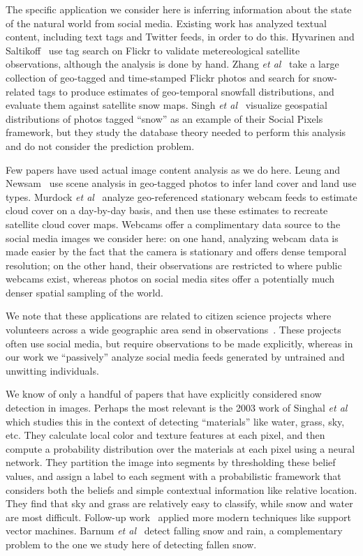 The specific application we consider here is inferring
information about the state of the natural world from social media.
Existing work has analyzed textual content, including text tags and
Twitter feeds, in order to do this. Hyvarinen and
Saltikoff~\cite{meteo} use tag search on Flickr to validate
metereological satellite observations, although the analysis is done
by hand. Zhang \textit{et al}~\cite{ecology2012www} take a large
collection of geo-tagged and time-stamped Flickr photos and search for
snow-related tags to produce estimates of geo-temporal snowfall
distributions, and evaluate them against satellite snow maps.
Singh \textit{et al}~\cite{singh10socialpixels} visualize geospatial
distributions of photos tagged ``snow'' as an example of
their Social Pixels framework, but they study the
database theory needed to perform this analysis
and do not consider the prediction problem.  

Few papers have used actual image content
analysis as we do here. Leung and Newsam~\cite{Leung:2010wa} use scene
analysis in geo-tagged photos to infer land cover and land use types.
Murdock \textit{et al}~\cite{murdock} analyze  geo-referenced
stationary webcam feeds to estimate cloud cover on a day-by-day
basis, and then use these estimates to recreate satellite cloud cover
maps.  Webcams offer a complimentary data source to the social media
images we consider here: on one hand, analyzing webcam data is made
easier by the fact that the camera is stationary and offers dense
temporal resolution; on the other hand, their observations are restricted to 
where public webcams exist, whereas photos on social media sites 
offer a potentially much denser spatial sampling of the world.

We note that these applications are related to citizen science
projects where volunteers across a wide geographic area send 
in observations~\cite{greatsunflower,ebirds,king09snowtweets}. These projects
often use social media, but require observations to be made
explicitly, whereas in our work we ``passively'' analyze social
media feeds generated by untrained and unwitting individuals.

 We know of only a handful of
papers that have explicitly considered snow detection in
images. Perhaps the most relevant is the 2003 work of Singhal
\textit{et al}~\cite{singhal2003spatialcontext,luo2003spatialcontext}
which studies this in the context of detecting ``materials'' like
water, grass, sky, etc. They calculate local color and texture
features at each pixel, and then compute a probability
distribution over the materials at each pixel using a neural
network. They partition the image into segments by thresholding these
belief values, and assign a label to each segment with a probabilistic
framework that considers both the beliefs and simple
contextual information like relative location.
 They find that sky and grass
are relatively easy to classify, while snow and water are
most difficult.  Follow-up work~\cite{boutell2006semanticfeature,boutell2005exploiting}
applied more modern techniques like
support vector machines.  Barnum \textit{et al}~\cite{rain2009IJCV}
detect falling snow and rain, a complementary problem
to the one we study here of detecting fallen
snow.

